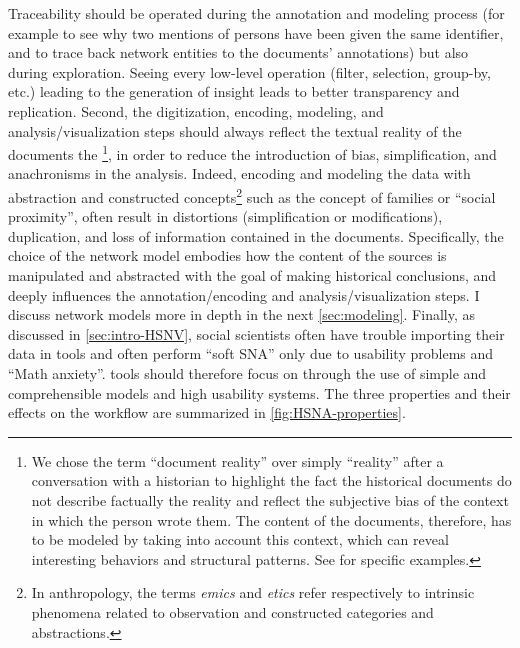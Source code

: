 Traceability should be operated during the annotation and modeling process (for example to see why two mentions of persons have been given the same identifier, and to trace back network entities to the documents' annotations) but also during exploration.
Seeing every low-level operation (filter, selection, group-by, etc.) leading to the generation of insight leads to better transparency and replication\cite{callahanVisTrailsVisualizationMeets2006, xuSurveyAnalysisUser2020}.
Second, the digitization, encoding, modeling, and analysis/visualization steps should always reflect the textual reality of the documents \ie the \reality\footnote{We chose the term ``document reality'' over simply ``reality'' after a conversation with a historian to highlight the fact the historical documents do not describe factually the reality and reflect the subjective bias of the context in which the person wrote them\cite{karila-cohenNouvellesCuisinesHistoire2018}. The content of the documents, therefore, has to be modeled by taking into account this context, which can reveal interesting behaviors and structural patterns. See \cite{lemercierBackSourcesPracticing2021} for specific examples.}, in order to reduce the introduction of bias, simplification, and anachronisms in the analysis\cite{karila-cohenNouvellesCuisinesHistoire2018, lemercierQuantitativeMethodsHumanities2019}.
Indeed, encoding and modeling the data with abstraction and constructed concepts\footnote{In anthropology, the terms \emph{emics} and \emph{etics} refer respectively to intrinsic phenomena related to observation and constructed categories and abstractions\cite{headlandEmicsEticsInsider1990}.} such as the concept of families or ``social proximity'', often result in distortions (simplification or modifications), duplication, and loss of information contained in the documents.
Specifically, the choice of the network model embodies how the content of the sources is manipulated and abstracted with the goal of making historical conclusions, and deeply influences the annotation/encoding and analysis/visualization steps.
I discuss network models more in depth in the next \autoref{sec:modeling}.
Finally, as discussed in \autoref{sec:intro-HSNV}, social scientists often have trouble importing their data in \sna tools\cite{alkadi2022} and often perform ``soft SNA''\cite{rollingerProlegomenaProblemsPerspectives2020} only due to usability problems and ``Math anxiety''\cite{paxtonDollarsSenseConvincing2006}.
\va tools should therefore focus on \simplicity through the use of simple and comprehensible models and high usability systems.
The three properties and their effects on the workflow are summarized in \autoref{fig:HSNA-properties}.





